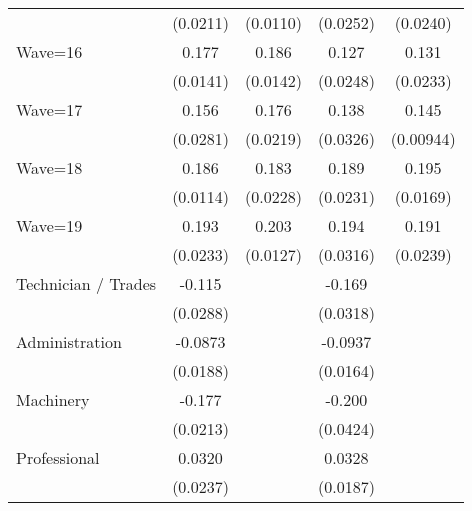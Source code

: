 {\begin{tabular}{l*{4}{c}}
                    &    (0.0211)         &    (0.0110)         &    (0.0252)         &    (0.0240)         \\
[1em]
Wave=16             &       0.177\sym{***}&       0.186\sym{***}&       0.127\sym{***}&       0.131\sym{***}\\
                    &    (0.0141)         &    (0.0142)         &    (0.0248)         &    (0.0233)         \\
[1em]
Wave=17             &       0.156\sym{***}&       0.176\sym{***}&       0.138\sym{***}&       0.145\sym{***}\\
                    &    (0.0281)         &    (0.0219)         &    (0.0326)         &   (0.00944)         \\
[1em]
Wave=18             &       0.186\sym{***}&       0.183\sym{***}&       0.189\sym{***}&       0.195\sym{***}\\
                    &    (0.0114)         &    (0.0228)         &    (0.0231)         &    (0.0169)         \\
[1em]
Wave=19             &       0.193\sym{***}&       0.203\sym{***}&       0.194\sym{***}&       0.191\sym{***}\\
                    &    (0.0233)         &    (0.0127)         &    (0.0316)         &    (0.0239)         \\
[1em]
Technician / Trades &      -0.115\sym{***}&                     &      -0.169\sym{***}&                     \\
                    &    (0.0288)         &                     &    (0.0318)         &                     \\
[1em]
Administration      &     -0.0873\sym{***}&                     &     -0.0937\sym{***}&                     \\
                    &    (0.0188)         &                     &    (0.0164)         &                     \\
[1em]
Machinery           &      -0.177\sym{***}&                     &      -0.200\sym{***}&                     \\
                    &    (0.0213)         &                     &    (0.0424)         &                     \\
[1em]
Professional        &      0.0320         &                     &      0.0328         &                     \\
                    &    (0.0237)         &                     &    (0.0187)         &                     \\

\end{tabular}}
